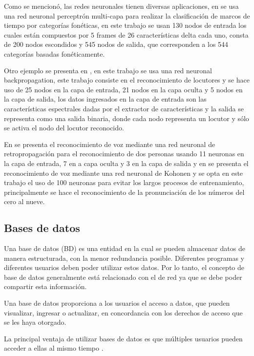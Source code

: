 		Como se mencionó, las redes neuronales tienen diversas aplicaciones, en \cite{LunaMoreno2001} se usa una red neuronal perceptrón multi-capa para realizar la clasificación de marcos de tiempo por categorías fonéticas, en este trabajo se usan 130 nodos de entrada los cuales están compuestos por 5 frames de 26 características delta cada uno, consta de 200 nodos escondidos y 545 nodos de salida, que corresponden a los 544 categorías basadas fonéticamente.

		Otro ejemplo se presenta en \cite{CruzBeltran}, en este trabajo se usa una red neuronal backpropagation, este trabajo consiste en el reconocimiento de locutores y se hace uso de 25 nodos en la capa de entrada, 21 nodos en la capa oculta y 5 nodos en la capa de salida, los datos ingresados en la capa de entrada son las características espectrales dadas por el extractor de características y la salida se representa como una salida binaria, donde cada nodo representa un locutor y sólo se activa el nodo del locutor reconocido.

		En \cite{RasconMontiel2009} se presenta el reconocimiento de voz mediante una red  neuronal de retropropagación para el reconocimiento de dos personas usando 11 neuronas en la capa de entrada, 7 en a capa oculta y 3 en la capa de salida y en \cite{Fernandez} se presenta el reconocimiento de voz mediante una red neuronal de Kohonen y se opta en este trabajo el uso de 100 neuronas para evitar los largos procesos de entrenamiento, principalmente se hace el reconocimiento de la pronunciación de los números del cero al nueve.

		\subsection{Bases de datos}

		Una base de datos (BD) es una entidad en la cual se pueden almacenar datos de manera estructurada, con la menor redundancia posible. Diferentes programas y diferentes usuarios deben poder utilizar estos datos. Por lo tanto, el concepto de base de datos generalmente está relacionado con el de red ya que se debe poder compartir esta información.

		Una base de datos proporciona a los usuarios el acceso a datos, que pueden visualizar, ingresar o actualizar, en concordancia con los derechos de acceso que se les haya otorgado.

		La principal ventaja de utilizar bases de datos es que múltiples usuarios pueden acceder a ellas al mismo tiempo \cite{BD2015}.

